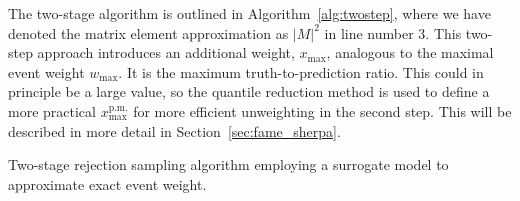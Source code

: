 \documentclass[main.tex]{subfiles}
\begin{document}
The two-stage algorithm is outlined in Algorithm~\ref{alg:twostep}, where we have
denoted the matrix element approximation as $|M|^{2}$ in line number 3. This
two-step approach introduces an additional weight, $x_{\mathrm{max}}$, analogous
to the maximal event weight $w_{\mathrm{max}}$. It is the maximum truth-to-prediction
ratio. This could in principle be a large value, so the quantile reduction method
is used to define a more practical $x_{\mathrm{max}}^{\mathrm{p.m.}}$ for more efficient
unweighting in the second step. This will be described in more detail in Section~\ref{sec:fame_sherpa}.
\begin{algorithm}[ht]
    \caption{Two-stage rejection sampling algorithm employing
    a surrogate model to approximate exact event weight.}
    \label{alg:twostep}
\end{algorithm}
\end{document}
